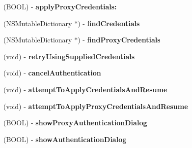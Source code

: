 \begin{DoxyCompactItemize}
\item 
\hypertarget{interface_a_s_i_h_t_t_p_request_a53e09e81268eb7230b4b5498ed2eb7d1}{
(\-B\-O\-O\-L) -\/ {\bfseries apply\-Proxy\-Credentials\-:}}
\label{interface_a_s_i_h_t_t_p_request_a53e09e81268eb7230b4b5498ed2eb7d1}

\item 
\hypertarget{interface_a_s_i_h_t_t_p_request_af337cbd50189506479260c6069ca2ded}{
(\-N\-S\-Mutable\-Dictionary $\ast$) -\/ {\bfseries find\-Credentials}}
\label{interface_a_s_i_h_t_t_p_request_af337cbd50189506479260c6069ca2ded}

\item 
\hypertarget{interface_a_s_i_h_t_t_p_request_aee0699cfb5ba5749a1461dfa56440121}{
(\-N\-S\-Mutable\-Dictionary $\ast$) -\/ {\bfseries find\-Proxy\-Credentials}}
\label{interface_a_s_i_h_t_t_p_request_aee0699cfb5ba5749a1461dfa56440121}

\item 
\hypertarget{interface_a_s_i_h_t_t_p_request_aad1efa3b1bc64006cc033bd0d4eee7cc}{
(void) -\/ {\bfseries retry\-Using\-Supplied\-Credentials}}
\label{interface_a_s_i_h_t_t_p_request_aad1efa3b1bc64006cc033bd0d4eee7cc}

\item 
\hypertarget{interface_a_s_i_h_t_t_p_request_a25d3d77f917c5f8b9956f6a45022dae2}{
(void) -\/ {\bfseries cancel\-Authentication}}
\label{interface_a_s_i_h_t_t_p_request_a25d3d77f917c5f8b9956f6a45022dae2}

\item 
\hypertarget{interface_a_s_i_h_t_t_p_request_ad3da0a488faf41101bbf73a8071456e8}{
(void) -\/ {\bfseries attempt\-To\-Apply\-Credentials\-And\-Resume}}
\label{interface_a_s_i_h_t_t_p_request_ad3da0a488faf41101bbf73a8071456e8}

\item 
\hypertarget{interface_a_s_i_h_t_t_p_request_a03ce363e92c2d5dbe7229f021b0230a5}{
(void) -\/ {\bfseries attempt\-To\-Apply\-Proxy\-Credentials\-And\-Resume}}
\label{interface_a_s_i_h_t_t_p_request_a03ce363e92c2d5dbe7229f021b0230a5}

\item 
\hypertarget{interface_a_s_i_h_t_t_p_request_ad9c4b7b0abc790e74806860c6d7a7a5b}{
(\-B\-O\-O\-L) -\/ {\bfseries show\-Proxy\-Authentication\-Dialog}}
\label{interface_a_s_i_h_t_t_p_request_ad9c4b7b0abc790e74806860c6d7a7a5b}

\item 
\hypertarget{interface_a_s_i_h_t_t_p_request_a64d812546f152b29ddd614938ffa5539}{
(\-B\-O\-O\-L) -\/ {\bfseries show\-Authentication\-Dialog}}
\label{interface_a_s_i_h_t_t_p_request_a64d812546f152b29ddd614938ffa5539}


\end{DoxyCompactItemize}
